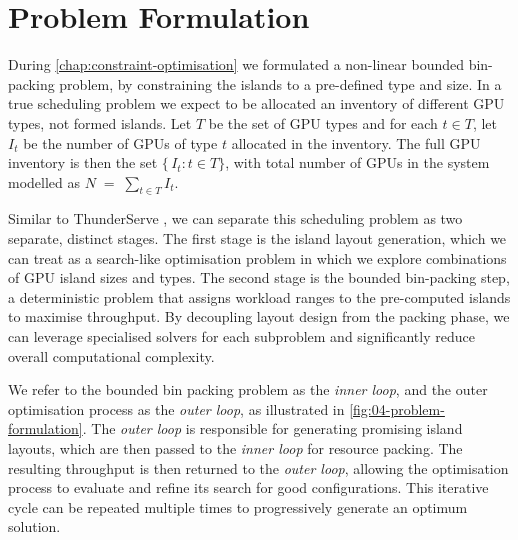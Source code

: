 \section{Problem Formulation}
\label{chap:problem-formulation}

During \autoref{chap:constraint-optimisation} we formulated a non-linear bounded bin-packing problem, by constraining the islands to a pre-defined type and size.
In a true scheduling problem we expect to be allocated an inventory of different GPU types, not formed islands.
Let \(T\) be the set of GPU types and for each \(t \in T\), let \(I_t\) be the number of GPUs of type \(t\) allocated in the inventory. The full GPU inventory is then the set \(\{\,I_t : t \in T\}\), with total number of GPUs in the system modelled as
\(N \;=\; \sum_{t \in T} I_t\).

Similar to ThunderServe \autocite{jiangThunderServeHighperformanceCostefficient2025}, we can separate this scheduling problem as two separate, distinct stages.
The first stage is the island layout generation, which we can treat as a search-like optimisation problem in which we explore combinations of GPU island sizes and types.
The second stage is the bounded bin-packing step, a deterministic problem that assigns workload ranges to the pre-computed islands to maximise throughput.
By decoupling layout design from the packing phase, we can leverage specialised solvers for each subproblem and significantly reduce overall computational complexity. 

We refer to the bounded bin packing problem as the \textit{inner loop}, and the outer optimisation process as the \textit{outer loop}, as illustrated in \autoref{fig:04-problem-formulation}.
The \textit{outer loop} is responsible for generating promising island layouts, which are then passed to the \textit{inner loop} for resource packing.
The resulting throughput is then returned to the \textit{outer loop}, allowing the optimisation process to evaluate and refine its search for good configurations.
 This iterative cycle can be repeated multiple times to progressively generate an optimum solution.
 
